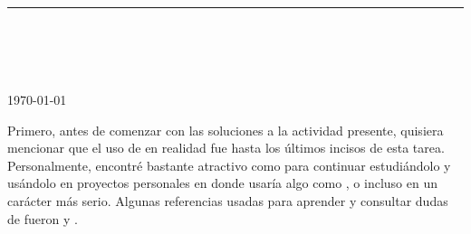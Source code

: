 



\thispagestyle{empty}

\begin{center}
\textsc{\theinstitution}\\[2mm]

\thedepartment

\rule{0.6\textwidth}{0.5pt}\\[2mm]

\thecourse \\[4mm]

{\Large \textbf{\thetitle}}\\[2mm]

\theauthor \\[2mm]

{\small \today}
\end{center}
\medskip

\vspace{1cm}

Primero, antes de comenzar con las soluciones a la actividad presente, quisiera mencionar que el uso de  en realidad fue hasta los últimos incisos de esta tarea. Personalmente, encontré  bastante atractivo como para continuar estudiándolo y usándolo en proyectos personales en donde usaría algo como , o incluso en un carácter más serio. Algunas referencias usadas para aprender y consultar dudas de  fueron \cite{matthew2016beautiful} y \cite{matthias2018htdp}.
\vspace{1cm}

